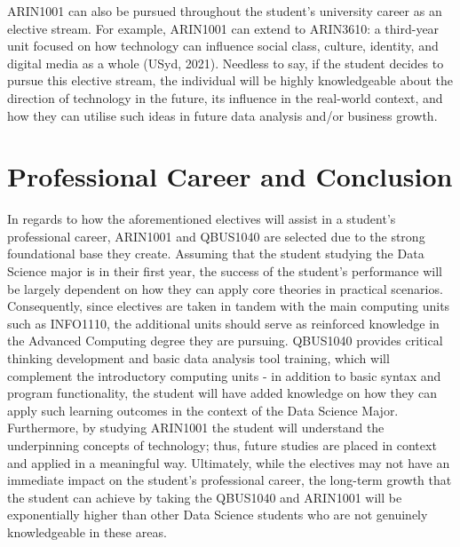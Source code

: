 \documentclass[11pt, a4paper]{report}
\begin{document}
ARIN1001 can also be pursued throughout the student’s university career as an elective stream. For example, ARIN1001 can extend to ARIN3610: a third-year unit focused on how technology can influence social class, culture, identity, and digital media as a whole (USyd, 2021). Needless to say, if the student decides to pursue this elective stream, the individual will be highly knowledgeable about the direction of technology in the future, its influence in the real-world context, and how they can utilise such ideas in future data analysis and/or business growth. 


\section{\textbf{Professional Career and Conclusion}}


In regards to how the aforementioned electives will assist in a student’s professional career, ARIN1001 and QBUS1040 are selected due to the strong foundational base they create. Assuming that the student studying the Data Science major is in their first year, the success of the student’s performance will be largely dependent on how they can apply core theories in practical scenarios. Consequently, since electives are taken in tandem with the main computing units such as INFO1110, the additional units should serve as reinforced knowledge in the Advanced Computing degree they are pursuing. QBUS1040 provides critical thinking development and basic data analysis tool training, which will complement the introductory computing units - in addition to basic syntax and program functionality, the student will have added knowledge on how they can apply such learning outcomes in the context of the Data Science Major. Furthermore, by studying ARIN1001 the student will understand the underpinning concepts of technology; thus, future studies are placed in context and applied in a meaningful way. Ultimately, while the electives may not have an immediate impact on the student’s professional career, the long-term growth that the student can achieve by taking the QBUS1040 and ARIN1001 will be exponentially higher than other Data Science students who are not genuinely knowledgeable in these areas. 
\end{document}
